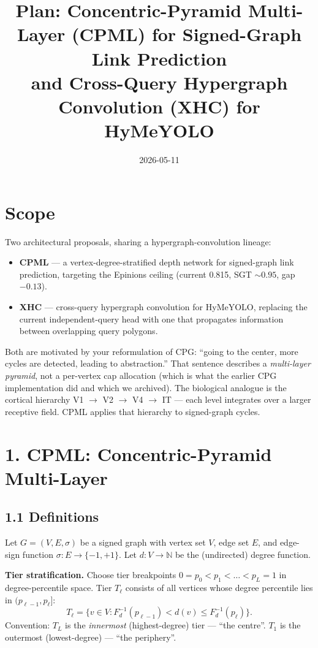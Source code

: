 \documentclass[10pt]{article}
\title{Plan: Concentric-Pyramid Multi-Layer (CPML) for Signed-Graph
  Link Prediction \\ and Cross-Query Hypergraph Convolution (XHC) for
  HyMeYOLO}
\author{}
\date{2026-05-11}
\begin{document}
\maketitle

\section*{Scope}

Two architectural proposals, sharing a hypergraph-convolution lineage:

\begin{itemize}
  \item \textbf{CPML} --- a vertex-degree-stratified depth network for
    signed-graph link prediction, targeting the Epinions ceiling
    (current 0.815, SGT $\sim 0.95$, gap $-0.13$).
  \item \textbf{XHC} --- cross-query hypergraph convolution for
    HyMeYOLO, replacing the current independent-query head with one
    that propagates information between overlapping query polygons.
\end{itemize}

Both are motivated by your reformulation of CPG: ``going to the center,
more cycles are detected, leading to abstraction.'' That sentence
describes a \emph{multi-layer pyramid}, not a per-vertex cap allocation
(which is what the earlier CPG implementation did and which we
archived). The biological analogue is the cortical hierarchy V1
$\to$ V2 $\to$ V4 $\to$ IT --- each level integrates over a larger
receptive field. CPML applies that hierarchy to signed-graph cycles.

\section*{1. CPML: Concentric-Pyramid Multi-Layer}

\subsection*{1.1 Definitions}

Let $G = (V, E, \sigma)$ be a signed graph with vertex set $V$, edge
set $E$, and edge-sign function $\sigma : E \to \{-1, +1\}$. Let
$d : V \to \mathbb{N}$ be the (undirected) degree function.

\textbf{Tier stratification.} Choose tier breakpoints
$0 = p_0 < p_1 < \ldots < p_L = 1$ in degree-percentile space. Tier
$T_\ell$ consists of all vertices whose degree percentile lies in
$(p_{\ell-1}, p_\ell]$:
\[
  T_\ell = \{ v \in V : F_d^{-1}(p_{\ell-1}) < d(v) \le F_d^{-1}(p_\ell) \}.
\]
Convention: $T_L$ is the \emph{innermost} (highest-degree) tier ---
``the centre''. $T_1$ is the outermost (lowest-degree) ---
``the periphery''.
\end{document}

